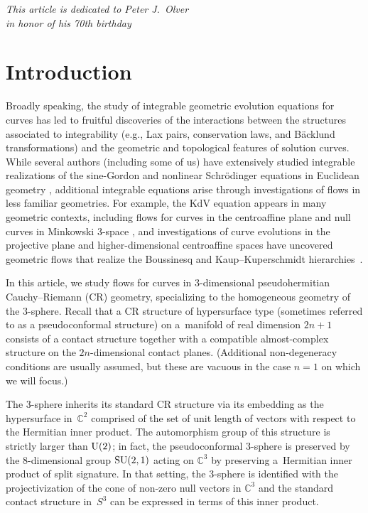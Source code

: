 \documentclass[pdftex]{sigma}
\def\C{\mathbb C}
\numberwithin{equation}{section}
\begin{document}
\begin{flushright}
\begin{minipage}{70mm}
\it This article is dedicated to Peter J.~Olver\\ in honor of his 70th birthday
\end{minipage}
\end{flushright}

\renewcommand{\thefootnote}{\arabic{footnote}}
\setcounter{footnote}{0}

\section{Introduction}
Broadly speaking, the study of integrable geometric evolution equations for curves has led to fruitful discoveries of the interactions between the structures associated to integrability (e.g., Lax pairs, conservation laws, and B\"acklund transformations) and the geometric and topological features of solution curves. While several authors (including some of us) have extensively studied integrable realizations of the sine-Gordon and nonlinear Schr\"odinger equations in Euclidean geometry \cite{CI99,CI01,LP91}, additional integrable equations arise through investigations of flows in less familiar geometries. For example, the KdV equation appears in many geometric contexts, including flows for curves in the centroaffine plane \cite{CIM1,Pi} and null curves in Minkowski 3-space \cite{MN}, and investigations of curve evolutions in the projective plane and higher-dimensional centroaffine spaces have uncovered geometric flows that realize the Boussinesq and Kaup--Kuperschmidt hierarchies~\cite{CIM2,M1}.

In this article, we study flows for curves in 3-dimensional pseudohermitian Cauchy--Riemann (CR) geometry, specializing to the homogeneous geometry of the 3-sphere. Recall that a CR structure of hypersurface type (sometimes referred to as a pseudoconformal structure) on a~mani\-fold of real dimension $2n+1$ consists of a contact structure together with a compatible almost-complex structure on the $2n$-dimensional contact planes.
(Additional non-degeneracy conditions are usually assumed, but these are vacuous
in the case $n=1$ on which we will focus.)

The 3-sphere inherits its standard CR structure via its embedding as the hypersurface in~$\C^2$ comprised of the set of unit length
of vectors with respect to the Hermitian inner product. The automorphism group of this structure is strictly larger than ${\rm U}(2)$; in fact, the pseudoconformal 3-sphere is preserved by the 8-dimensional group ${\rm SU}(2,1)$ acting on $\C^3$ by preserving a~Hermitian inner product of split signature. In that setting, the 3-sphere is identified with the projectivization of the cone of non-zero null vectors in $\C^3$ and the standard contact structure in~$S^3$ can be expressed in terms of this inner product.
\end{document}
